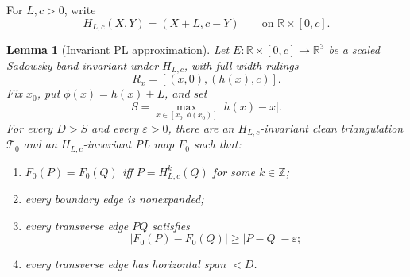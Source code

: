 \documentclass[12pt]{article}
\newcommand{\R}{\mathbb R}
\newcommand{\Z}{\mathbb Z}
\theoremstyle{plain}
\newtheorem{lemma}[theorem]{Lemma}
\begin{document}
For \(L,c>0\), write
\[
H_{L,c}(X,Y)=(X+L,c-Y)\qquad\text{on }\R\times[0,c].
\]

\begin{lemma}[Invariant PL approximation]\label{lem:PL}
Let \(E:\R\times[0,c]\to\R^3\) be a scaled Sadowsky band invariant under
\(H_{L,c}\), with full-width rulings
\[
R_x=[(x,0),(h(x),c)].
\]
Fix \(x_0\), put \(\phi(x)=h(x)+L\), and set
\[
S=\max_{x\in[x_0,\phi(x_0)]}|h(x)-x|.
\]
For every \(D>S\) and every \(\varepsilon>0\), there are an
\(H_{L,c}\)-invariant clean triangulation \(\mathcal T_0\) and an
\(H_{L,c}\)-invariant PL map \(F_0\) such that:
\begin{enumerate}
\item \(F_0(P)=F_0(Q)\) iff \(P=H_{L,c}^k(Q)\) for some \(k\in\Z\);
\item every boundary edge is nonexpanded;
\item every transverse edge \(PQ\) satisfies
\[
|F_0(P)-F_0(Q)|\ge |P-Q|-\varepsilon;
\]
\item every transverse edge has horizontal span \(<D\).
\end{enumerate}
\end{lemma}
\end{document}
